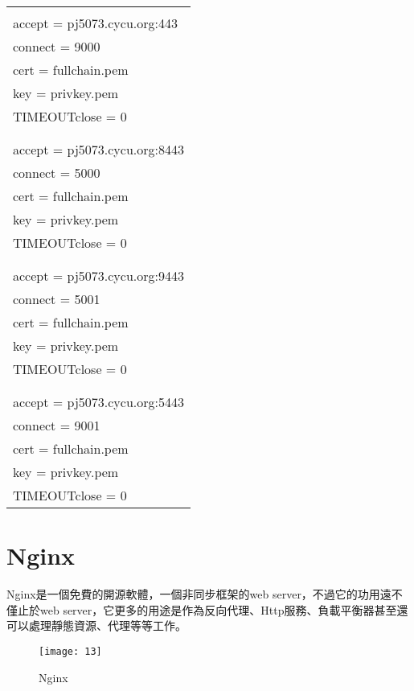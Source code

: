 \par
\begin{center}
\begin{tabular}{||p{15cm}|} %
\hline
[https]
\\
accept  = pj5073.cycu.org:443
\\
connect = 9000
\\
cert = fullchain.pem
\\
key = privkey.pem
\\
TIMEOUTclose = 0
\\
\\ 
[https]
\\
accept = pj5073.cycu.org:8443
\\
connect = 5000
\\
cert = fullchain.pem
\\
key = privkey.pem
\\
TIMEOUTclose = 0
\\
\\
[https]
\\
accept = pj5073.cycu.org:9443
\\
connect = 5001
\\
cert = fullchain.pem
\\
key = privkey.pem
\\
TIMEOUTclose = 0
\\
\\
[https]
\\
accept = pj5073.cycu.org:5443
\\
connect = 9001
\\
cert = fullchain.pem
\\
key = privkey.pem
\\
TIMEOUTclose = 0
\\
\hline
\end{tabular}
\end{center}
\par

\renewcommand{\baselinestretch}{20} %
\section{Nginx}
\par
\renewcommand{\baselinestretch}{1} %
\twelve \qquad Nginx是一個免費的開源軟體，一個非同步框架的web server，不過它的功用遠不僅止於web server，它更多的用途是作為反向代理、Http服務、負載平衡器甚至還可以處理靜態資源、代理等等工作。
\\
\par
\renewcommand{\baselinestretch}{1.7} %
\begin{figure}[hbt!]
\begin{center}
\texttt{[image: 13]}
\caption{\large Nginx}\label{fig.Nginx}
\end{center}
\end{figure}
\par

